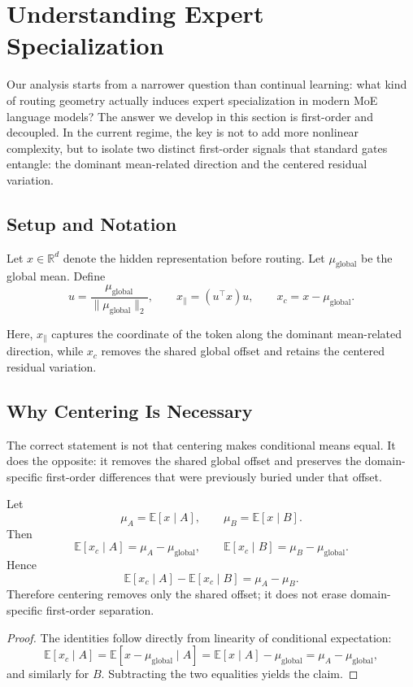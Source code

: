 \section{Understanding Expert Specialization}
\label{sec:analysis}

Our analysis starts from a narrower question than continual learning: what kind of routing geometry actually induces expert specialization in modern MoE language models? The answer we develop in this section is first-order and decoupled. In the current regime, the key is not to add more nonlinear complexity, but to isolate two distinct first-order signals that standard gates entangle: the dominant mean-related direction and the centered residual variation.

\subsection{Setup and Notation}
Let $x \in \mathbb{R}^d$ denote the hidden representation before routing. Let $\mu_{\mathrm{global}}$ be the global mean. Define
$$
u=\frac{\mu_{\mathrm{global}}}{\|\mu_{\mathrm{global}}\|_2}, \qquad
x_{\parallel}=(u^\top x)u, \qquad
x_c=x-\mu_{\mathrm{global}}.
$$

Here, $x_{\parallel}$ captures the coordinate of the token along the dominant mean-related direction, while $x_c$ removes the shared global offset and retains the centered residual variation.

\subsection{Why Centering Is Necessary}
The correct statement is not that centering makes conditional means equal. It does the opposite: it removes the shared global offset and preserves the domain-specific first-order differences that were previously buried under that offset.

\begin{proposition}
Let
$$
\mu_A=\mathbb{E}[x\mid A], \qquad \mu_B=\mathbb{E}[x\mid B].
$$
Then
$$
\mathbb{E}[x_c\mid A]=\mu_A-\mu_{\mathrm{global}}, \qquad
\mathbb{E}[x_c\mid B]=\mu_B-\mu_{\mathrm{global}}.
$$
Hence
$$
\mathbb{E}[x_c\mid A]-\mathbb{E}[x_c\mid B]=\mu_A-\mu_B.
$$
Therefore centering removes only the shared offset; it does not erase domain-specific first-order separation.
\end{proposition}

\begin{proof}
The identities follow directly from linearity of conditional expectation:
$$
\mathbb{E}[x_c\mid A]
=
\mathbb{E}[x-\mu_{\mathrm{global}}\mid A]
=
\mathbb{E}[x\mid A]-\mu_{\mathrm{global}}
=
\mu_A-\mu_{\mathrm{global}},
$$
and similarly for $B$. Subtracting the two equalities yields the claim.
\end{proof}


